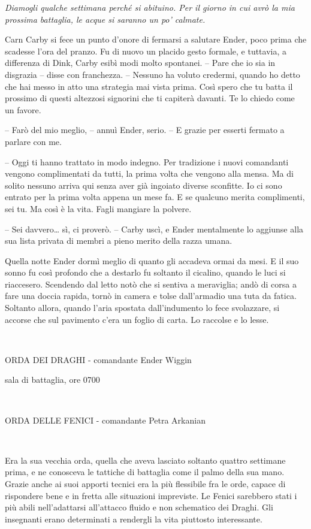 \emph{{Diamogli qualche settimana perché si abituino. Per il giorno in
		cui avrò la mia prossima battaglia, le acque si saranno un po'
		calmate.}}

{Carn Carby si fece un punto d'onore di fermarsi a salutare Ender, poco
	prima che scadesse l'ora del pranzo. Fu di nuovo un placido gesto
	formale, e tuttavia, a differenza di Dink, Carby esibì modi molto
	spontanei. -- Pare che io sia in disgrazia -- disse con franchezza. --
	Nessuno ha voluto credermi, quando ho detto che hai messo in atto una
	strategia mai vista prima. Così spero che tu batta il prossimo di questi
	altezzosi signorini che ti capiterà davanti. Te lo chiedo come un
	favore.}

{-- Farò del mio meglio, -- annuì Ender, serio. -- E grazie per esserti
	fermato a parlare con me.}

{-- Oggi ti hanno trattato in modo indegno. Per tradizione i nuovi
	comandanti vengono complimentati da tutti, la prima volta che vengono
	alla mensa. Ma di solito nessuno arriva qui senza aver già ingoiato
	diverse sconfitte. Io ci sono entrato per la prima volta appena un mese
	fa. E se qualcuno merita complimenti, sei tu. Ma così è la vita. Fagli
	mangiare la polvere.}

{-- Sei davvero\ldots{} sì, ci proverò. -- Carby uscì, e Ender
	mentalmente lo aggiunse alla sua lista privata di membri a pieno merito
	della razza umana.}

{Quella notte Ender dormì meglio di quanto gli accadeva ormai da mesi. E
	il suo sonno fu così profondo che a destarlo fu soltanto il cicalino,
	quando le luci si riaccesero. Scendendo dal letto notò che si sentiva a
	meraviglia; andò di corsa a fare una doccia rapida, tornò in camera e
	tolse dall'armadio una tuta da fatica. Soltanto allora, quando l'aria
	spostata dall'indumento lo fece svolazzare, si accorse che sul pavimento
	c'era un foglio di carta. Lo raccolse e lo lesse.}

{~}

\begin{center}
	{ORDA DEI DRAGHI - comandante Ender Wiggin}

{sala di battaglia, ore 0700}

{~}

{ORDA DELLE FENICI - comandante Petra Arkanian}
\end{center}

{~}

{Era la sua vecchia orda, quella che aveva lasciato soltanto quattro
	settimane prima, e ne conosceva le tattiche di battaglia come il palmo
	della sua mano. Grazie anche ai suoi apporti tecnici era la più
	flessibile fra le orde, capace di rispondere bene e in fretta alle
	situazioni impreviste. Le Fenici sarebbero stati i più abili
	nell'adattarsi all'attacco fluido e non schematico dei Draghi. Gli
	insegnanti erano determinati a rendergli la vita piuttosto
	interessante.}

